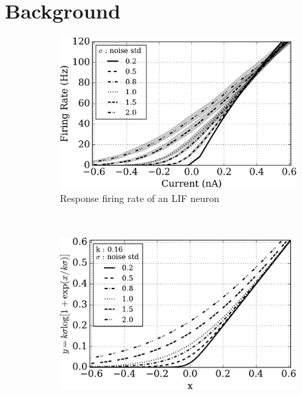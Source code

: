 \documentclass[10pt,journal,compsoc]{IEEEtran}
\begin{document}




	\section{Background}
	\label{sec:back}
	\begin{figure}[thb!]
		\centering
		\begin{subfigure}[t]{0.4\textwidth}
			\includegraphics[width=\textwidth]{pics_iconip/siegert.png}
			\caption{Response firing rate of an LIF neuron}
		\end{subfigure}\\
		\begin{subfigure}[t]{0.4\textwidth}
			\includegraphics[width=\textwidth]{pics_iconip/4.pdf}

\end{subfigure}
\end{figure}
\end{document}
